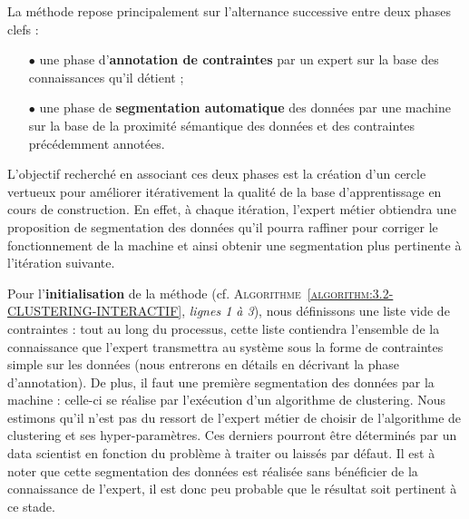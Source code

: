 		La méthode repose principalement sur l'alternance successive entre deux phases clefs :
		\begin{itemize}
			\item[\(\bullet\)] une phase d'\textbf{annotation de contraintes}
			par un expert sur la base des connaissances qu'il détient ;
			\item[\(\bullet\)] une phase de \textbf{segmentation automatique} des données
			par une machine sur la base de la proximité sémantique des données et des contraintes précédemment annotées.
		\end{itemize}
		
		L'objectif recherché en associant ces deux phases est la création d'un cercle vertueux pour améliorer itérativement la qualité de la base d'apprentissage en cours de construction.
		En effet, à chaque itération, l'expert métier obtiendra une proposition de segmentation des données qu'il pourra raffiner pour corriger le fonctionnement de la machine et ainsi obtenir une segmentation plus pertinente à l'itération suivante.
		
		Pour l'\textbf{initialisation} de la méthode (cf. \textsc{Algorithme~\ref{algorithm:3.2-CLUSTERING-INTERACTIF}}, \textit{lignes 1 à 3}), nous définissons une liste vide de contraintes : tout au long du processus, cette liste contiendra l'ensemble de la connaissance que l'expert transmettra au système sous la forme de contraintes simple sur les données (nous entrerons en détails en décrivant la phase d'annotation).
		De plus, il faut une première segmentation des données par la machine : celle-ci se réalise par l'exécution d'un algorithme de clustering.
		Nous estimons qu'il n'est pas du ressort de l'expert métier de choisir de l'algorithme de clustering et ses hyper-paramètres.
		Ces derniers pourront être déterminés par un data scientist en fonction du problème à traiter ou laissés par défaut.
		Il est à noter que cette segmentation des données est réalisée sans bénéficier de la connaissance de l'expert, il est donc peu probable que le résultat soit pertinent à ce stade.
		
